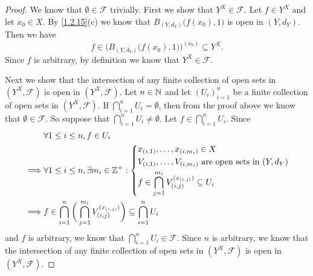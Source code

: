 \begin{proof}
  We know that \(\emptyset \in \mathcal{F}\) trivially.
  First we show that \(Y^X \in \mathcal{F}\).
  Let \(f \in Y^X\) and let \(x_0 \in X\).
  By \cref{1.2.15}(c) we know that \(B_{(Y, d_Y)}\big(f(x_0), 1\big)\) is open in \((Y, d_Y)\).
  Then we have
  \[
    f \in \Big(B_{(Y, d_Y)}\big(f(x_0), 1\big)\Big)^{(x_0)} \subseteq Y^X.
  \]
  Since \(f\) is arbitrary, by definition we know that \(Y^X \in \mathcal{F}\).

  Next we show that the intersection of any finite collection of open sets in \((Y^X, \mathcal{F})\) is open in \((Y^X, \mathcal{F})\).
  Let \(n \in \mathbb{N}\) and let \((U_i)_{i = 1}^n\) be a finite collection of open sets in \((Y^X, \mathcal{F})\).
  If \(\bigcap_{i = 1}^n U_i = \emptyset\), then from the proof above we know that \(\emptyset \in \mathcal{F}\).
  So suppose that \(\bigcap_{i = 1}^n U_i \neq \emptyset\).
  Let \(f \in \bigcap_{i = 1}^n U_i\).
  Since
  \begin{align*}
             & \forall 1 \leq i \leq n, f \in U_i                                                                                  \\
    \implies & \forall 1 \leq i \leq n, \exists m_i \in \mathbb{Z}^+ : \begin{dcases}
                                                                 x_{(i, 1)}, \dots, x_{(i, m_i)} \in X                              \\
                                                                 V_{(i, 1)}, \dots, V_{(i, m_i)} \text{ are open sets in } (Y, d_Y) \\
                                                                 f \in \bigcap_{j = 1}^{m_i} V_{(i, j)}^{(x_{(i, j)})} \subseteq U_i
                                                               \end{dcases}  \\
    \implies & f \in \bigcap_{i = 1}^n \bigg(\bigcap_{j = 1}^{m_i} V_{(i, j)}^{(x_{(i, j)})}\bigg) \subseteq \bigcap_{i = 1}^n U_i
  \end{align*}
  and \(f\) is arbitrary, we know that \(\bigcap_{i = 1}^n U_i \in \mathcal{F}\).
  Since \(n\) is arbitrary, we know that the intersection of any finite collection of open sets in \((Y^X, \mathcal{F})\) is open in \((Y^X, \mathcal{F})\).


\end{proof}
